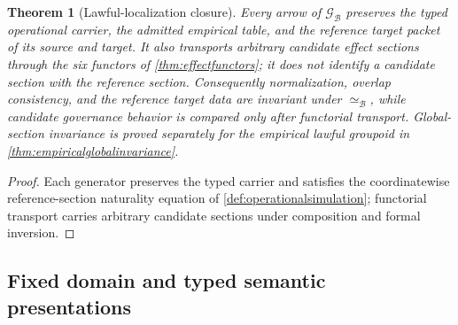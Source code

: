 \documentclass[11pt]{article}
\newtheorem{theorem}{Theorem}[section]
\theoremstyle{definition}
\newcommand{\Bell}{\mathcal{B}}
\newcommand{\BellLaw}{\mathscr{G}_{\Bell}}
\newcommand{\BellEq}{\simeq_{\Bell}}
\begin{document}
\begin{theorem}[Lawful-localization closure]\label{thm:lawfulequivalencecomplete}
Every arrow of $\BellLaw$ preserves the typed operational carrier, the admitted empirical table, and the reference target packet of its source and target. It also transports arbitrary candidate effect sections through the six functors of \cref{thm:effectfunctors}; it does not identify a candidate section with the reference section. Consequently normalization, overlap consistency, and the reference target data are invariant under $\BellEq$, while candidate governance behavior is compared only after functorial transport. Global-section invariance is proved separately for the empirical lawful groupoid in \cref{thm:empiricalglobalinvariance}.
\end{theorem}
\begin{proof}
Each generator preserves the typed carrier and satisfies the coordinatewise reference-section naturality equation of \cref{def:operationalsimulation}; functorial transport carries arbitrary candidate sections under composition and formal inversion.
\end{proof}

\subsection{Fixed domain and typed semantic presentations}
\end{document}
